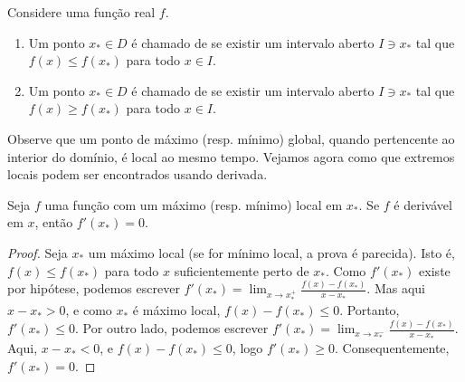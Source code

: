 \begin{defin}
Considere uma função real $f$.
\begin{enumerate}
\item Um ponto $x_*\in D$ é chamado de  se existir um intervalo aberto $I\ni x_*$ tal que
$f(x)\leq f(x_*)$ para todo $x\in I$.
\item Um ponto $x_*\in D$ é chamado de  se existir um intervalo aberto $I\ni x_*$ tal que
$f(x)\geq f(x_*)$ para todo $x\in I$.
\end{enumerate}
\end{defin}
\begin{center}
\begin{bmlimage}\end{bmlimage}
\label{Fig:maxgloballocal}
\end{center}

Observe que um ponto de máximo (resp. mínimo) global, quando pertencente
ao interior do domínio, é local ao mesmo tempo. 
Vejamos agora como que extremos locais podem ser encontrados usando derivada.

\begin{teo}\label{Teo:maxminlocderivadazero}
Seja $f$ uma função com um máximo (resp. mínimo) local em $x_*$. 
Se $f$ é derivável em $x$, então $f'(x_*)=0$.
\end{teo}
\begin{proof}
Seja $x_*$ um máximo local (se for mínimo local, a prova é parecida).
Isto é, $f(x)\leq f(x_*)$ para todo $x$ suficientemente perto de $x_*$. 
Como $f'(x_*)$ existe por hipótese, podemos escrever 
$f'(x_*)=\lim_{x\to x_*^+}\frac{f(x)-f(x_*)}{x-x_*}$. Mas aqui $x-x_*>0$, e 
como $x_*$ é máximo local, $f(x)-f(x_*)\leq 0$. Portanto, 
$f'(x_*)\leq 0$. 
Por outro lado, podemos escrever 
$f'(x_*)=\lim_{x\to x_*^-}\frac{f(x)-f(x_*)}{x-x_*}$. Aqui, $x-x_*<0$, e 
$f(x)-f(x_*)\leq 0$, logo $f'(x_*)\geq 0$. Consequentemente, $f'(x_*)=0$.
\end{proof}

